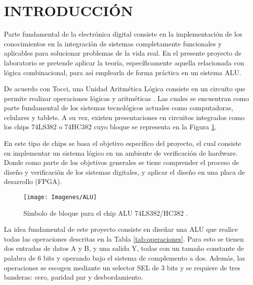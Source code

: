 \documentclass[journal,trans]{IEEEtran}
\begin{document}
\maketitle
\IEEEdisplaynontitleabstractindextext
\IEEEpeerreviewmaketitle

\section{INTRODUCCIÓN}

Parte fundamental de la electrónica digital consiste en la implementación de los conocimientos en la integración de sistemas completamente funcionales y aplicables para solucionar problemas de la vida real. En el presente proyecto de laboratorio se pretende aplicar la teoría, específicamente aquella relacionada con lógica combinacional, para así emplearla de forma práctica en un sistema ALU. 

De acuerdo con Tocci, una Unidad Aritmética Lógica consiste en un circuito que permite realizar operaciones lógicas y aritméticas \cite{Tocci}. Las cuales se encuentran como parte fundamental de los sistemas tecnológicos actuales como computadoras, celulares y tablets. A su vez, existen presentaciones en circuitos integrados como los chips 74LS382 o 74HC382 cuyo bloque se representa en la Figura \ref{fig:ALU}. 

En este tipo de chips se basa el objetivo específico del proyecto, el cual consiste en implementar un sistema lógico en un ambiente de verificación de hardware. Donde como parte de los objetivos generales se tiene comprender el proceso de diseño y verificación de los sistemas digitales, y aplicar el diseño en una placa de desarrollo (FPGA).


\begin{figure}[!h]
	\centering
	\texttt{[image: Imagenes/ALU]}
	\caption{Símbolo de bloque para el chip ALU 74LS382/HC382 \cite{Tocci}.}
	\label{fig:ALU}
\end{figure}

La idea fundamental de este proyecto consiste en diseñar una ALU que realice todas las operaciones descritas en la Tabla \ref{tab:operaciones}. Para esto se tienen dos entradas de datos A y B, y una salida Y, todas con un tamaño constante de palabra de 6 bits y operando bajo el sistema de complemento a dos. Además, las operaciones se escogen mediante un selector SEL de 3 bits y se requiere de tres banderas: cero, paridad par y desbordamiento. 
\end{document}
